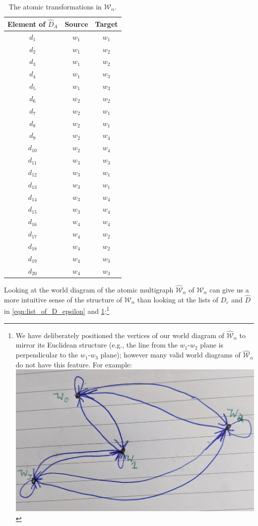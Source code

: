 \begin{table}[H]
    \centering
    \begin{tabular}{c|c c}
        \hline
        Element of $\hat{D}_{A}$ & Source  & Target  \\
        \hline
        $d_{1}$ & $w_{1}$ & $w_{1}$ \\
        $d_{2}$ & $w_{1}$ & $w_{2}$ \\
        $d_{3}$ & $w_{1}$ & $w_{2}$ \\
        $d_{4}$ & $w_{1}$ & $w_{3}$ \\
        $d_{5}$ & $w_{1}$ & $w_{3}$ \\
        $d_{6}$ & $w_{2}$ & $w_{2}$ \\
        $d_{7}$ & $w_{2}$ & $w_{1}$ \\
        $d_{8}$ & $w_{2}$ & $w_{1}$ \\
        $d_{9}$ & $w_{2}$ & $w_{4}$ \\
        $d_{10}$ & $w_{2}$ & $w_{4}$ \\
        $d_{11}$ & $w_{3}$ & $w_{3}$ \\
        $d_{12}$ & $w_{3}$ & $w_{1}$ \\
        $d_{13}$ & $w_{3}$ & $w_{1}$ \\
        $d_{14}$ & $w_{3}$ & $w_{4}$ \\
        $d_{15}$ & $w_{3}$ & $w_{4}$ \\
        $d_{16}$ & $w_{4}$ & $w_{4}$ \\
        $d_{17}$ & $w_{4}$ & $w_{2}$ \\
        $d_{18}$ & $w_{4}$ & $w_{2}$ \\
        $d_{19}$ & $w_{4}$ & $w_{3}$ \\
        $d_{20}$ & $w_{4}$ & $w_{3}$ \\
    \end{tabular}
    \caption{
    The atomic transformations in $\mathscr{W}_{\alpha}$.
    }
    \label{tab:2x2_gridworld_length_1_transformations}
\end{table}

Looking at the world diagram of the atomic multigraph $\hat{\mathscr{W}}_{\alpha}$ of $\mathscr{W}_{\alpha}$ can give us a more intuitive sense of the structure of $\mathscr{W}_{\alpha}$ than looking at the lists of $D_{\varepsilon}$ and $\hat{D}$ in \cref{eqn:list_of_D_epsilon} and \cref{tab:2x2_gridworld_length_1_transformations}:\footnote{
    We have deliberately positioned the vertices of our world diagram of $\hat{\mathscr{W}}_{\alpha}$ to mirror its Euclidean structure (e.g., the line from the $w_{1}$-$w_{2}$ plane is perpendicular to the $w_{1}$-$w_{3}$ plane); however many valid world diagrams of $\hat{\mathscr{W}}_{\alpha}$ do not have this feature.
    For example:
    \includegraphics[width=0.5\linewidth]{2MathematicalFramework/Images/2x2_cyclical_min_trans_quirky.jpg}
}

